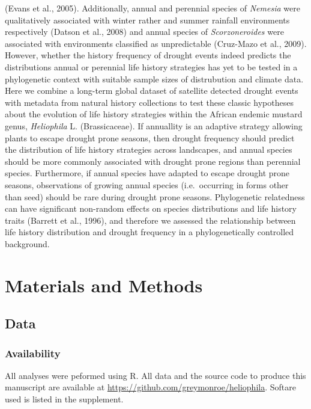 \documentclass[man,floatsintext]{apa6}
\theoremstyle{definition}
\theoremstyle{definition}
\theoremstyle{definition}
\theoremstyle{remark}
\begin{document}
(Evans et al., 2005). Additionally, annual and perennial species of
\emph{Nemesia} were qualitatively associated with winter rather and
summer rainfall environments respectively (Datson et al., 2008) and
annual species of \emph{Scorzoneroides} were associated with
environments classified as unpredictable (Cruz-Mazo et al., 2009).
However, whether the history frequency of drought events indeed predicts
the distributions annual or perennial life history strategies has yet to
be tested in a phylogenetic context with suitable sample sizes of
distrubution and climate data.\\
Here we combine a long-term global dataset of satellite detected drought
events with metadata from natural history collections to test these
classic hypotheses about the evolution of life history strategies within
the African endemic mustard genus, \emph{Heliophila} L. (Brassicaceae).
If annuallity is an adaptive strategy allowing plants to escape drought
prone seasons, then drought frequency should predict the distribution of
life history strategies across landscapes, and annual species should be
more commonly associated with drought prone regions than perennial
species. Furthermore, if annual species have adapted to escape drought
prone seasons, observations of growing annual species (i.e.~occurring in
forms other than seed) should be rare during drought prone seasons.
Phylogenetic relatedness can have significant non-random effects on
species distributions and life history traits (Barrett et al., 1996),
and therefore we assessed the relationship between life history
distribution and drought frequency in a phylogenetically controlled
background.

\hypertarget{materials-and-methods}{%
\section{Materials and Methods}\label{materials-and-methods}}

\hypertarget{data}{%
\subsection{Data}\label{data}}

\hypertarget{availability}{%
\subsubsection{Availability}\label{availability}}

All analyses were peformed using R. All data and the source code to
produce this manuscript are available at
\url{https://github.com/greymonroe/heliophila}. Softare used is listed
in the supplement.
\end{document}
